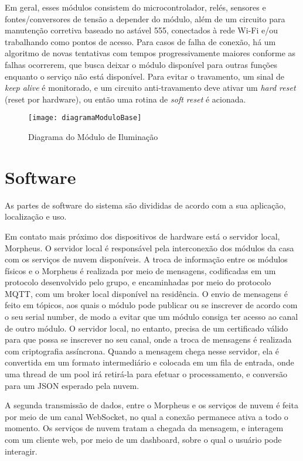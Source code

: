 Em geral, esses módulos consistem do microcontrolador, relés, sensores e fontes/conversores de tensão a depender do módulo, além de um circuito para manutenção corretiva baseado no astável 555, conectados à rede Wi-Fi e/ou trabalhando como pontos de acesso. Para casos de falha de conexão, há um algoritmo de novas tentativas com tempos progressivamente maiores conforme as falhas ocorrerem, que busca deixar o módulo disponível para outras funções enquanto o serviço não está disponível. Para evitar o travamento, um sinal de \textit{keep alive} é monitorado, e um circuito anti-travamento deve ativar um \textit{hard reset} (reset por hardware), ou então uma rotina de \textit{soft reset} é acionada.

\begin{figure}[H]
	\caption{\label{fig:diagramaModuloBase}Diagrama do Módulo de Iluminação}
	\begin{center}
		\texttt{[image: diagramaModuloBase]}
	\end{center}
\end{figure}


\section{Software}

As partes de software do sistema são divididas de acordo com a sua aplicação, localização e uso.

Em contato mais próximo dos dispositivos de hardware está o servidor local, Morpheus. O servidor local é responsável pela interconexão dos módulos da casa com os serviços de nuvem disponíveis. A troca de informação entre os módulos físicos e o Morpheus é realizada por meio de mensagens, codificadas em um protocolo desenvolvido pelo grupo, e encaminhadas por meio do protocolo MQTT, com um broker local disponível na residência. O envio de mensagens é feito em tópicos, aos quais o módulo pode publicar ou se inscrever de acordo com o seu serial number, de modo a evitar que um módulo consiga ter acesso ao canal de outro módulo. O servidor local, no entanto, precisa de um certificado válido para que possa se inscrever no seu canal, onde a troca de mensagens é realizada com criptografia assíncrona. Quando a mensagem chega nesse servidor, ela é convertida em um formato intermediário e colocada em um fila de entrada, onde uma thread de um pool irá retirá-la para efetuar o processamento, e conversão para um JSON esperado pela nuvem.

A segunda transmissão de dados, entre o Morpheus e os serviços de nuvem é feita por meio de um canal WebSocket, no qual a conexão permanece ativa a todo o momento. Os serviços de nuvem tratam a chegada da mensagem, e interagem com um cliente web, por meio de um dashboard, sobre o qual o usuário pode interagir.

